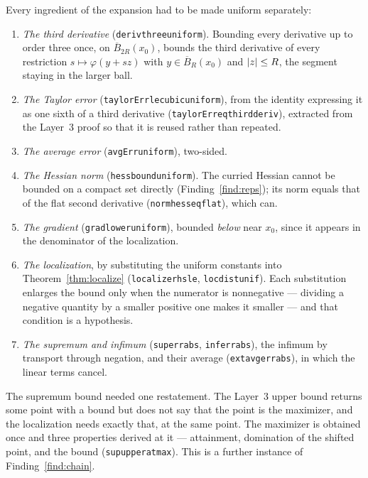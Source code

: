 \documentclass[11pt,reqno]{amsart}
\newcommand{\LEANREF}[1]{\texttt{\small\def\_{\textunderscore\allowbreak}#1}}
\DeclarePairedDelimiter{\abs}{\lvert}{\rvert}
\theoremstyle{plain}
\theoremstyle{definition}
\begin{document}
Every ingredient of the expansion had to be made uniform separately:
\begin{enumerate}
  \item \emph{The third derivative} (\LEANREF{deriv\_three\_uniform}).
        Bounding every derivative up to order three once, on
        $\overline{B}_{2R}(x_0)$, bounds the third derivative of every
        restriction $s \mapsto \varphi(y + sz)$ with $y \in \overline{B}_R(x_0)$
        and $\abs{z} \le R$, the segment staying in the larger ball.
  \item \emph{The Taylor error} (\LEANREF{taylorErr\_le\_cubic\_uniform}),
        from the identity expressing it as one sixth of a third derivative
        (\LEANREF{taylorErr\_eq\_third\_deriv}), extracted from the Layer~3
        proof so that it is reused rather than repeated.
  \item \emph{The average error} (\LEANREF{avgErr\_uniform}), two-sided.
  \item \emph{The Hessian norm} (\LEANREF{hess\_bound\_uniform}). The curried
        Hessian cannot be bounded on a compact set directly
        (Finding~\ref{find:reps}); its norm equals that of the flat second
        derivative (\LEANREF{norm\_hess\_eq\_flat}), which can.
  \item \emph{The gradient} (\LEANREF{grad\_lower\_uniform}), bounded
        \emph{below} near $x_0$, since it appears in the denominator of the
        localization.
  \item \emph{The localization}, by substituting the uniform constants into
        Theorem~\ref{thm:localize} (\LEANREF{localize\_rhs\_le},
        \LEANREF{loc\_dist\_unif}). Each substitution enlarges the bound only
        when the numerator is nonnegative --- dividing a negative quantity by a
        smaller positive one makes it smaller --- and that condition is a
        hypothesis.
  \item \emph{The supremum and infimum}
        (\LEANREF{sup\_err\_abs}, \LEANREF{inf\_err\_abs}), the infimum by
        transport through negation, and their average
        (\LEANREF{ext\_avg\_err\_abs}), in which the linear terms cancel.
\end{enumerate}
The supremum bound needed one restatement. The Layer~3 upper bound returns
some point with a bound but does not say that the point is the maximizer, and
the localization needs exactly that, at the same point. The maximizer is
obtained once and three properties derived at it --- attainment, domination of
the shifted point, and the bound (\LEANREF{sup\_upper\_at\_max}). This is a
further instance of Finding~\ref{find:chain}.
\end{document}
